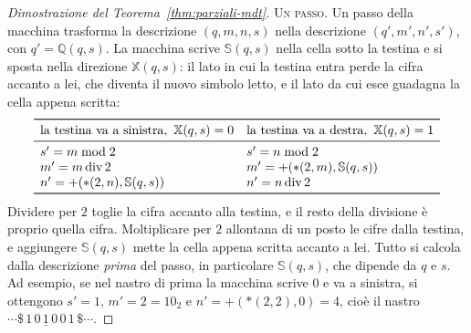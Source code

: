 \documentclass[a4paper, 11pt, oneside]{book}
\theoremstyle{formale}
\begin{document}
\begin{proof}[Dimostrazione del Teorema~\ref{thm:parziali-mdt}]
        \medskip
        \textsc{Un passo}. Un passo della macchina trasforma la descrizione
        $(q, m, n, s)$ nella descrizione $(q', m', n', s')$, con
        $q' = \mathbb{Q}(q, s)$. La macchina scrive
        $\mathbb{S}(q, s)$ nella cella sotto la testina e si sposta nella direzione
        $\mathbb{X}(q, s)$: il lato in cui la testina entra perde la cifra accanto a lei,
        che diventa il nuovo simbolo letto, e il lato da cui esce guadagna la cella appena
        scritta:
        \begin{equation*}
            \begin{array}{ll}
                \toprule
                \text{la testina va a sinistra}, \ \mathbb{X}(q, s) = 0
                    & \text{la testina va a destra}, \ \mathbb{X}(q, s) = 1 \\
                \midrule
                s' = m \bmod 2 & s' = n \bmod 2 \\
                m' = m \operatorname{div} 2
                    & m' = {+}({*}(2, m), \mathbb{S}(q, s)) \\
                n' = {+}({*}(2, n), \mathbb{S}(q, s)) & n' = n \operatorname{div} 2 \\
                \bottomrule
            \end{array}
        \end{equation*}
        Dividere per $2$ toglie la cifra accanto alla testina, e il resto della divisione
        \`e proprio quella cifra. Moltiplicare per $2$ allontana di un posto le cifre
        dalla testina, e aggiungere $\mathbb{S}(q, s)$ mette la cella appena scritta
        accanto a lei. Tutto si calcola dalla descrizione \emph{prima} del passo, in
        particolare $\mathbb{S}(q, s)$, che dipende da $q$ e $s$. Ad esempio, se nel
        nastro di prima la macchina scrive $0$ e va a sinistra, si ottengono $s' = 1$,
        $m' = 2 = 10_2$ e $n' = {+}({*}(2, 2), 0) = 4$, cio\`e il nastro
        $\cdots \$\, 1\, 0\, \underline{1}\, 0\, 0\, 1\, \$ \cdots$.


\end{proof}
\end{document}

